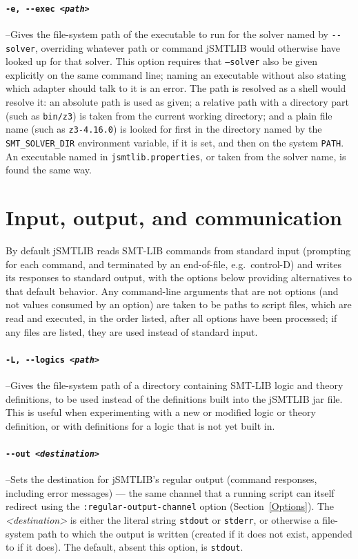 \documentclass[12pt,oneside]{report}
\begin{document}
\paragraph{\tt -e, -{}-exec \it <path>}\label{opt:exec} --Gives the file-system path of the executable to run for the solver named by {\tt -{}-solver}, overriding whatever path or command jSMTLIB would otherwise have looked up for that solver. This option requires that {\tt --solver} also be given explicitly on the same command line; naming an executable without also stating which adapter should talk to it is an error. The path is resolved as a shell would resolve it: an absolute path is used as given; a relative path with a directory part (such as {\tt bin/z3}) is taken from the current working directory; and a plain file name (such as {\tt z3-4.16.0}) is looked for first in the directory named by the {\tt SMT\_SOLVER\_DIR} environment variable, if it is set, and then on the system {\tt PATH}. An executable named in {\tt jsmtlib.properties}, or taken from the solver name, is found the same way.

\section{Input, output, and communication}

By default jSMTLIB reads SMT-LIB commands from standard input (prompting for each command, and terminated by an end-of-file, e.g.\ control-D) and writes its responses to standard output, with the options below providing alternatives to that default behavior. Any command-line arguments that are not options (and not values consumed by an option) are taken to be paths to script files, which are read and executed, in the order listed, after all options have been processed; if any files are listed, they are used instead of standard input.

\paragraph{\tt -L, -{}-logics \it <path>}\label{opt:logics} --Gives the file-system path of a directory containing SMT-LIB logic and theory definitions, to be used instead of the definitions built into the jSMTLIB jar file. This is useful when experimenting with a new or modified logic or theory definition, or with definitions for a logic that is not yet built in.

\paragraph{\tt -{}-out \it <destination>}\label{opt:out} --Sets the destination for jSMTLIB's regular output (command responses, including error messages) --- the same channel that a running script can itself redirect using the {\tt :regular-output-channel} option (Section~\ref{Options}). The {\it <destination>} is either the literal string {\tt stdout} or {\tt stderr}, or otherwise a file-system path to which the output is written (created if it does not exist, appended to if it does). The default, absent this option, is {\tt stdout}.
\end{document}
